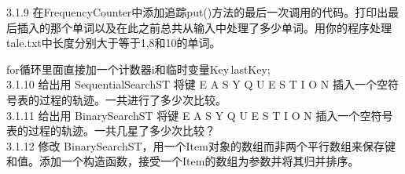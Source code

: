 \documentclass[14pt,a4paper]{article}  %
\begin{document}
\begin{CJK*}{UTF8}{song}
3.1.9 在FrequencyCounter中添加追踪put()方法的最后一次调用的代码。打印出最后插入的那个单词以及在此之前总共从输入中处理了多少单词。用你的程序处理tale.txt中长度分别大于等于1,8和10的单词。

for循环里面直接加一个计数器i和临时变量Key\,lastKey;\\

3.1.10 给出用 SequentialSearchST 将键 E A S Y Q U E S T I O N 插入一个空符号表的过程的轨迹。一共进行了多少次比较。\\

3.1.11 给出用 BinarySearchST 将键 E A S Y Q U E S T I O N 插入一个空符号表的过程的轨迹。一共几星了多少次比较？\\

3.1.12 修改 BinarySearchST，用一个Item对象的数组而非两个平行数组来保存键和值。添加一个构造函数，接受一个Item的数组为参数并将其归并排序。

\end{CJK*}
\end{document}
